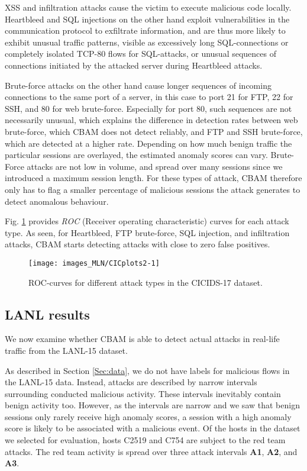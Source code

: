 XSS and infiltration attacks cause the victim to execute malicious code locally. Heartbleed and SQL injections on the other hand exploit vulnerabilities in the communication protocol to exfiltrate information, and are thus more likely to exhibit unusual traffic patterns, visible as excessively long SQL-connections or completely isolated TCP-80 flows for SQL-attacks, or unusual sequences of connections initiated by the attacked server during Heartbleed attacks.

Brute-force attacks on the other hand cause longer sequences of incoming connections to the same port of a server, in this case to port 21 for FTP, 22 for SSH, and 80 for web brute-force. Especially for port 80, such sequences are not necessarily unusual, which explains the difference in detection rates between web brute-force, which CBAM does not detect reliably, and FTP and SSH brute-force, which are detected at a higher rate. Depending on how much benign traffic the particular sessions are overlayed, the estimated anomaly scores can vary. Brute-Force attacks are not low in volume, and spread over many sessions since we introduced a maximum session length. For these types of attack, CBAM therefore only has to flag a smaller percentage of malicious sessions the attack generates to detect anomalous behaviour.

Fig. \ref{fig:CICplots2} provides \emph{ROC} (Receiver operating characteristic) curves for each attack type. As seen, for Heartbleed, FTP brute-force, SQL injection, and infiltration attacks, CBAM starts detecting attacks with close to zero false positives.


\begin{figure}[ht]
\centering
\texttt{[image: images\_MLN/CICplots2-1]} 
\vspace{-0.5cm}
\caption[ROC-curves for different attack types.]{ROC-curves for different attack types in the CICIDS-17 dataset.}\label{fig:CICplots2}
\end{figure}

\subsection{LANL results}

We now examine whether CBAM is able to detect actual attacks in real-life traffic from the LANL-15 dataset.

As described in Section \ref{Sec:data}, we do not have labels for malicious flows in the LANL-15 data. Instead, attacks are described by narrow intervals surrounding conducted malicious activity. These intervals inevitably contain benign activity too. However, as the intervals are narrow and we saw that benign sessions only rarely receive high anomaly scores, a session with a high anomaly score is likely to be associated with a malicious event. Of the hosts in the dataset we selected for evaluation, hosts C2519 and C754 are subject to the red team attacks. The red team activity is spread over three attack intervals \textbf{A1}, \textbf{A2}, and \textbf{A3}. 

